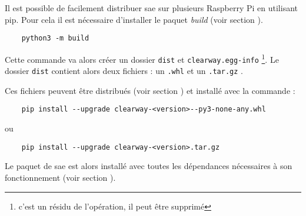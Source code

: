 Il est possible de facilement distribuer \gls{sae} sur plusieurs Raspberry Pi en utilisant \gls{pip}. Pour
cela il est nécessaire d'installer le \gls{paquet} \textit{build} (voir section ).

\begin{verbatim}
    python3 -m build
\end{verbatim}

Cette commande va alors créer un dossier \texttt{dist} et \texttt{clearway.egg-info}
\footnote{c'est un résidu de l'opération, il  peut être supprimé}. Le dossier \texttt{dist} contient
alors deux fichiers : un \texttt{.whl} et un \texttt{.tar.gz} \nocite{wheel}\nocite{setuptools}.\newline

Ces fichiers peuvent être distribués (voir section ) et installé avec la commande :

\begin{verbatim}
    pip install --upgrade clearway-<version>--py3-none-any.whl
\end{verbatim}

ou

\begin{verbatim}
    pip install --upgrade clearway-<version>.tar.gz
\end{verbatim}

Le \gls{paquet} de \gls{sae} est alors installé avec toutes les dépendances nécessaires à son fonctionnement (voir
section ).
